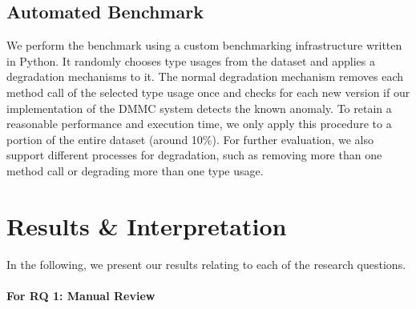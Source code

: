 
\subsection{Automated Benchmark}

We perform the benchmark using a custom benchmarking infrastructure written in Python.
It randomly chooses type usages from the dataset and applies a degradation mechanisms to it.
The normal degradation mechanism removes each method call of the selected type usage once and checks for each new version if our implementation of the $\text{DMMC}$ system detects the known anomaly.
To retain a reasonable performance and execution time, we only apply this procedure to a portion of the entire dataset (around 10\%).
For further evaluation, we also support different processes for degradation, such as removing more than one method call or degrading more than one type usage.

\section{Results \& Interpretation}

In the following, we present our results relating to each of the research questions.

\paragraph{For RQ 1: Manual Review}

